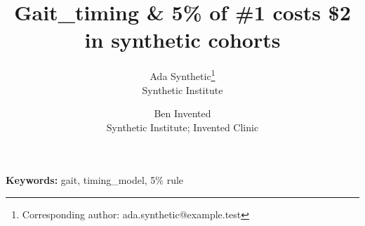 \documentclass{article}
\title{Gait\_timing \& 5\% of \#1 costs \$2 in synthetic cohorts}
\author{Ada Synthetic\thanks{Corresponding author: ada.synthetic@example.test}\\{\small Synthetic Institute} \and Ben Invented\\{\small Synthetic Institute; Invented Clinic}}
\date{}
\begin{document}
\maketitle
\begin{abstract}

\end{abstract}
\noindent\textbf{Keywords:} gait, timing\_model, 5\% rule






\end{document}
